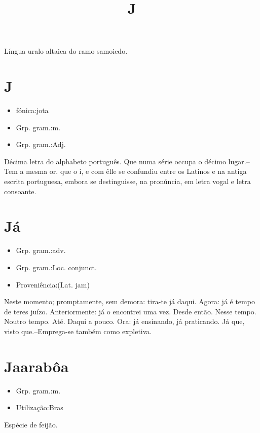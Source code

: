 \documentclass{article}
\title{J}
\begin{document}
Língua uralo altaica do ramo samoiedo.
\section{J}
\begin{itemize}
\item {fónica:jota}
\end{itemize}
\begin{itemize}
\item {Grp. gram.:m.}
\end{itemize}
\begin{itemize}
\item {Grp. gram.:Adj.}
\end{itemize}
Décima letra do alphabeto português.
Que numa série occupa o décimo lugar.--Tem a mesma or. que o \textunderscore i\textunderscore , e com êlle se confundiu entre os Latinos e na antiga escrita portuguesa, embora se destinguisse, na pronúncia, em letra vogal e letra consoante.
\section{Já}
\begin{itemize}
\item {Grp. gram.:adv.}
\end{itemize}
\begin{itemize}
\item {Grp. gram.:Loc. conjunct.}
\end{itemize}
\begin{itemize}
\item {Proveniência:(Lat. \textunderscore jam\textunderscore )}
\end{itemize}
Neste momento; promptamente, sem demora: \textunderscore tira-te já daqui\textunderscore .
Agora: \textunderscore já é tempo de teres juízo\textunderscore .
Anteriormente: \textunderscore já o encontrei uma vez\textunderscore .
Desde então.
Nesse tempo.
Noutro tempo.
Até.
Daqui a pouco.
Ora: \textunderscore já ensinando, já praticando\textunderscore .
\textunderscore Já que\textunderscore , visto que.--Emprega-se também como expletiva.
\section{Jaarabôa}
\begin{itemize}
\item {Grp. gram.:m.}
\end{itemize}
\begin{itemize}
\item {Utilização:Bras}
\end{itemize}
Espécie de feijão.
\end{document}
